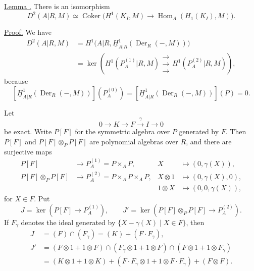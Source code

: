 \underline{Lemma .} There is an isomorphism
\[
 D^2(A|R,M)\simeq
 \operatorname{Coker}\bigl(
 H^1(K_I,M)\longrightarrow
 \operatorname{Hom}_A(H_1(K_I),M)\bigr).
\]

\underline{Proof.} We have
\begin{align*}
D^2(A|R,M)
 &=H^1\bigl(A|R,
   \underline H^1_{A|R}(\operatorname{Der}_R(-,M))\bigr)\\
 &=\ker\left(
   H^1(P_A^{(1)}|R,M)
   \mathrel{\substack{\longrightarrow\\[-.6ex]\longrightarrow\\[-.6ex]\longrightarrow}}
   H^1(P_A^{(2)}|R,M)\right),
\end{align*}
because
\[
 [\underline H^1_{A|R}(\operatorname{Der}_R(-,M))](P_A^{(0)})
 =[\underline H^1_{A|R}(\operatorname{Der}_R(-,M))](P)=0.
\]

Let
\[
 0\longrightarrow K\longrightarrow F\xrightarrow{\gamma}I
 \longrightarrow0
\]
be exact. Write $P[F]$ for the symmetric algebra over $P$
generated by $F$. Then $P[F]$ and
$P[F]\otimes_PP[F]$ are polynomial algebras over $R$, and there
are surjective maps
\begin{align*}
P[F]&\longrightarrow P_A^{(1)}=P\times_AP,
&X&\longmapsto(0,\gamma(X)),\\
P[F]\otimes_PP[F]&\longrightarrow
P_A^{(2)}=P\times_AP\times_AP,
&X\otimes1&\longmapsto(0,\gamma(X),0),\\[-.3ex]
&&1\otimes X&\longmapsto(0,0,\gamma(X)),
\end{align*}
for $X\in F$. Put
\[
 J=\ker(P[F]\longrightarrow P_A^{(1)}),
 \qquad
 J'=\ker(P[F]\otimes_PP[F]\longrightarrow P_A^{(2)}).
\]
If $F_\gamma$ denotes the ideal generated by
$\{X-\gamma(X)\mid X\in F\}$, then
\begin{align*}
J&=(F)\cap(F_\gamma)=(K)+(F\cdot F_\gamma),\\
J'&=(F\otimes1+1\otimes F)
 \cap(F_\gamma\otimes1+1\otimes F)
 \cap(F\otimes1+1\otimes F_\gamma)\\
&=(K\otimes1+1\otimes K)
 +(F\cdot F_\gamma\otimes1+1\otimes F\cdot F_\gamma)
 +(F\otimes F).
\end{align*}


